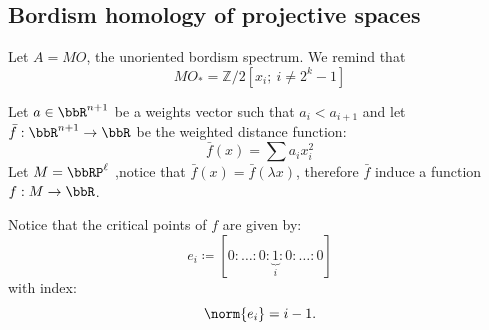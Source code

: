 
\subsection{Bordism homology of projective spaces}
Let $A= MO$, the unoriented bordism spectrum. We remind that 
\begin{equation*}
    MO_* = \mathbb{Z}/2\left [x_i;\ i \neq 2^k-1 \right ]
\end{equation*}

Let $a\in \bbR^{n+1}$ be a weights vector such that $a_i < a_{i+1}$ and let $\bar{f}:\bbR^{n+1} \to \bbR$ be the weighted distance function:
\begin{equation*}
    \bar{f}(x)=\sum a_i x_i^2
\end{equation*}
Let $M=\bbRP^\ell$ ,notice that $\bar{f}(x)=\bar{f}(\lambda x)$, therefore $\bar{f}$ induce a function $f:M\to \bbR$.

Notice that the critical points of $f$ are given by:
\begin{equation*}
    e_i \coloneqq [0: \dots :0:\underbrace{1}_i:0:\dots :0]
\end{equation*}
with index:
\begin{equation*}
    \norm{e_i} = i-1.
\end{equation*}

